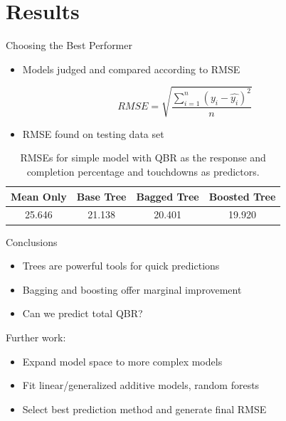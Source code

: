 \documentclass{beamer}
\begin{document}
	\section{Results}
	
	\begin{frame}{Choosing the Best Performer}
		\begin{itemize}
			\item Models judged and compared according to RMSE
		\end{itemize}
		\begin{equation}
			RMSE=\sqrt{\frac{\sum_{i=1}^{n}(y_{i}-\hat{y_{i}})^{2}}{n}}
		\end{equation}		
		\begin{itemize}
			\item RMSE found on testing data set
		\end{itemize}
		\begin{table}
			\centering
			\begin{tabular}{|c|c|c|c|}
				\hline
				Mean Only & Base Tree & Bagged Tree & Boosted Tree\\
				\hline
				25.646 & 21.138 & 20.401 & 19.920\\
				\hline
			\end{tabular}
		\caption{RMSEs for simple model with QBR as the response and completion percentage and touchdowns as predictors.}
		\end{table}
	\end{frame}

	\begin{frame}{Conclusions}
		\begin{itemize}
			\item Trees are powerful tools for quick predictions
			\item Bagging and boosting offer marginal improvement
			\item Can we predict total QBR?
		\end{itemize}
		Further work:
		\begin{itemize}
			\item Expand model space to more complex models
			\item Fit linear/generalized additive models, random forests
			\item Select best prediction method and generate final RMSE
		\end{itemize}
	\end{frame}
\end{document}
